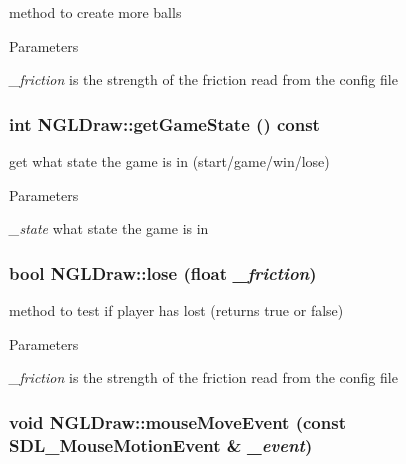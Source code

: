 method to create more balls 
\begin{DoxyParams}{Parameters}
\item[{\em \_\-friction}]is the strength of the friction read from the config file \end{DoxyParams}
\hypertarget{classNGLDraw_a3f6d511c845e8855366d3007c73a8162}{
\subsubsection[{getGameState}]{\setlength{\rightskip}{0pt plus 5cm}int NGLDraw::getGameState () const}}
\label{classNGLDraw_a3f6d511c845e8855366d3007c73a8162}


get what state the game is in (start/game/win/lose) 
\begin{DoxyParams}{Parameters}
\item[{\em \_\-state}]what state the game is in \end{DoxyParams}
\hypertarget{classNGLDraw_a2063f77a75af245c035db344e14dcff6}{
\subsubsection[{lose}]{\setlength{\rightskip}{0pt plus 5cm}bool NGLDraw::lose (float {\em \_\-friction})}}
\label{classNGLDraw_a2063f77a75af245c035db344e14dcff6}


method to test if player has lost (returns true or false) 
\begin{DoxyParams}{Parameters}
\item[{\em \_\-friction}]is the strength of the friction read from the config file \end{DoxyParams}
\hypertarget{classNGLDraw_a7950c9e9bfd16dc9b6075881396df876}{
\subsubsection[{mouseMoveEvent}]{\setlength{\rightskip}{0pt plus 5cm}void NGLDraw::mouseMoveEvent (const SDL\_\-MouseMotionEvent \& {\em \_\-event})}}
\label{classNGLDraw_a7950c9e9bfd16dc9b6075881396df876}


